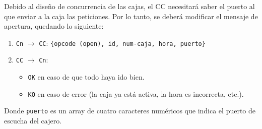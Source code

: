 Debido al diseño de concurrencia de las cajas, el CC necesitará saber el puerto al que enviar a la caja las peticiones. Por lo tanto, se deberá modificar el mensaje de apertura, quedando lo siguiente:
\begin{enumerate}
    \item \texttt{Cn} $\rightarrow$ \texttt{CC}: \texttt{\{opcode (open), id, num-caja, hora, puerto\}}
    \item \texttt{CC} $\rightarrow$ \texttt{Cn}: 
    \begin{itemize}
        \item \texttt{OK} en caso de que todo haya ido bien.
        \item \texttt{KO} en caso de error (la caja ya está activa, la hora es incorrecta, etc.).
    \end{itemize}
\end{enumerate}

Donde \texttt{puerto} es un array de cuatro caracteres numéricos que indica el puerto de escucha del cajero.